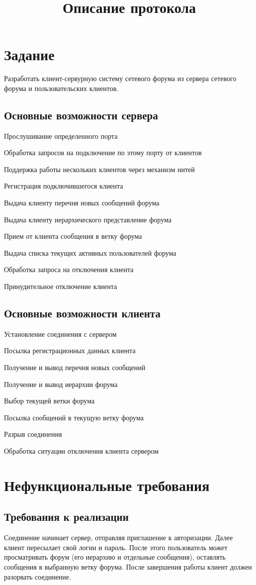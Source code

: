 \documentclass[10pt,a4paper]{report}
\begin{document}
\title{Описание протокола}
\chapter{Задание}
Разработать клиент-сервурную систему сетевого форума из сервера сетевого форума и пользовательских клиентов.
\section{Основные возможности сервера}
\item Прослушивание определенного порта
\item Обработка запросов на подключение по этому порту от клиентов
\item Поддержка работы нескольких клиентов через механизм нитей
\item Регистрация подключившегося клиента
\item Выдача клиенту перечня новых сообщений форума
\item Выдача клиенту иерархического представление форума
\item Прием от клиента сообщения в ветку форума
\item Выдача списка текущих активных пользователей форума
\item Обработка запроса на отключения клиента
\item Принудительное отключение клиента
\section{Основные возможности клиента}
\item Установление соединения с сервером
\item Посылка регистрационных данных клиента
\item Получение и вывод перечня новых сообщений 
\item Получение и вывод иерархии форума
\item Выбор текущей ветки форума
\item Посылка сообщений в текущую ветку форума
\item Разрыв соединения
\item Обработка ситуации отключения клиента сервером
\chapter{Нефункциональные требования}
\section{Требования к реализации}
Соединение начинает сервер, отправляя приглашение к авторизации. Далее клиент пересылает свой логин и пароль. После этого пользователь может просматривать форум (его иерархию и отдельные сообщения), оставлять сообщения в выбранную ветку форума. После завершения работы клиент должен разорвать соединение.
\end{document}
